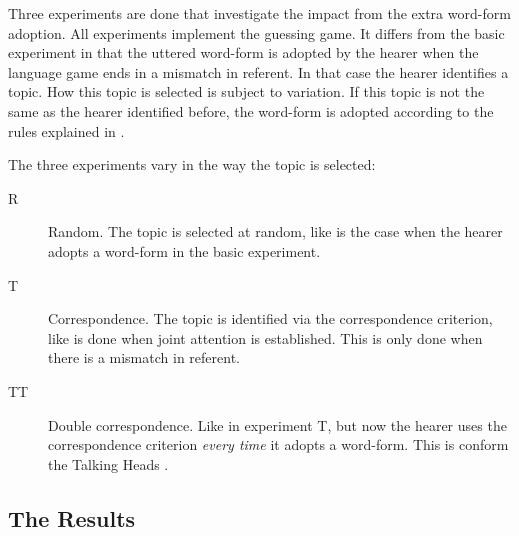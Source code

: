 Three experiments are done that investigate the impact from the extra word-form adoption. All experiments implement the guessing game. It differs from the basic experiment in that the uttered word-form is adopted by the hearer when the language game ends in a mismatch in referent. In that case the hearer identifies a topic. How this topic is selected is subject to variation. If this topic is not the same as the hearer identified before, the word-form is adopted according to the rules explained in .

The three experiments vary in the way the topic is selected:

\begin{description}
\item[R] Random. The topic is selected at random, like is the case when the hearer adopts a word-form in the basic experiment.

\item[T] Correspondence. The topic is identified via the correspondence criterion, like is done when joint attention is established. This is only done when there is a mismatch in referent.

\item[TT] Double correspondence. Like in experiment T, but now the hearer uses the correspondence criterion {\em every time} it adopts a word-form. This is conform the Talking Heads \citep{steels:2000}.
\end{description}

\subsection{The Results}


